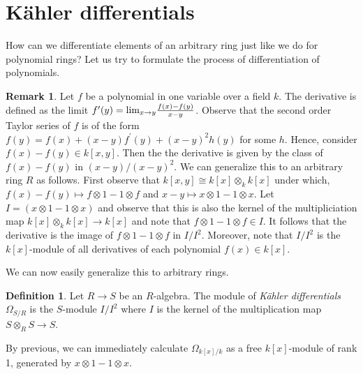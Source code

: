 \documentclass[letterpaper,10pt,twoside]{amsart}
\newcommand{\isom}{\cong}
\newcommand{\tens}{\otimes}
\newcommand{\ulim}{\text{\rm lim}}
\theoremstyle{proposition}
\theoremstyle{definition}
\newtheorem{definition}[proposition]{Definition}
\theoremstyle{theorem}
\theoremstyle{definition}
\newtheorem{remark}[proposition]{\textbf{Remark}}
\theoremstyle{definition}
\theoremstyle{definition}
\theoremstyle{lemma}
\theoremstyle{definition}
\theoremstyle{definition}
\theoremstyle{corollary}
\theoremstyle{definition}
\begin{document}
	\section{K\"ahler differentials}
	How can we differentiate elements of an arbitrary ring just like we do for polynomial rings? Let us try to formulate the process of differentiation of polynomials.
	\begin{remark}
		Let $f$ be a polynomial in one variable over a field $k$. The derivative is defined as the limit $f^{\prime}(y) = \ulim_{x\to y}\frac{f(x)-f(y)}{x-y}$. Observe that the second order Taylor series of $f$ is of the form $f(y) = f(x) + (x-y)f^{\prime}(y) + (x-y)^{2}h(y)$ for some $h$. Hence, consider $f(x)-f(y) \in k[x,y]$. Then the the derivative is given by the class of $f(x)-f(y)$ in $(x-y)/(x-y)^{2}$. We can generalize this to an arbitrary ring $R$ as follows. First observe that $k[x,y] \isom k[x]\tens_{k}k[x]$ under which, $f(x)-f(y)\mapsto f\tens 1 - 1\tens f$ and $x-y \mapsto x\tens 1 - 1\tens x$. Let $I = (x\tens 1- 1\tens x)$ and observe that this is also the kernel of the multipliciation map $k[x]\tens_{k}k[x] \to k[x]$ and note that $f\tens 1 - 1\tens f \in I$. It follows that the derivative is the image of $f\tens 1 - 1\tens f$ in $I/I^{2}$. Moreover, note that $I/I^{2}$ is the $k[x]$-module of all derivatives of each polynomial $f(x)\in  k[x]$.
	\end{remark}
	We can now easily generalize this to arbitrary rings.
	\begin{definition}
		Let $R \to S$ be an $R$-algebra. The module of \textit{K\"ahler differentials} $\Omega_{S/R}$ is the $S$-module $I/I^{2}$ where $I$ is the kernel of the multiplication map $S\tens_{R} S \to S$.
	\end{definition}
	By previous, we can immediately calculate $\Omega_{k[x]/k}$ as a free $k[x]$-module of rank 1, generated by $x\tens 1-1\tens x$.
\end{document}
